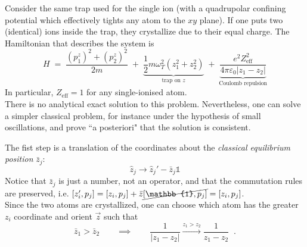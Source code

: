 Consider the same trap used for the single ion (with a quadrupolar confining potential which effectively tights any atom to the $xy$ plane). If one puts two (identical) ions inside the trap, they crystallize due to their equal charge.
The Hamiltonian that describes the system is 
\begin{equation}
\label{eq:atomsharmonic}
H \;=\;
\frac{(p_1^z)^2+(p_2^z)^2}{2m}
\;+\;
\underbrace{\frac{1}{2}m\omega_T^2(z_1^2+z_2^2)}
_{\text{trap on }{z}}
\;+\;
\underbrace{\frac{e^2 Z_{\text{eff}}^2
}{4\pi \varepsilon_0|z_1-z_2|}}
_{\text{Coulomb repulsion}}
\end{equation}
In particular, $Z_{\text{eff}}=1$ for any single-ionised atom. \\ 
There is no analytical exact solution to this problem. Nevertheless, one can solve a simpler classical problem, for instance under the hypothesis of small oscillations, and prove ``a posteriori" that the solution is consistent.

The fist step is a translation of the coordinates about the \textit{classical equilibrium position}
$\bar{z}_j$:
\begin{equation*}
\hat{z}_j \rightarrow \hat{z}_j' - \bar{z}_j\mathds{1}
\end{equation*}
Notice that $\bar{z}_j$ is just a number, not an operator, and that the commutation rules are preserved, i.e. $[z_i',p_j]=[z_i,p_j]+\bar{z}\cancel{[\mathbb{1},p_j]} = [z_i,p_j]$. \\
Since the two atoms are crystallized, one can choose which atom has the greater $z_i$ coordinate and orient $\vec{z}$ such that 
$$\bar{z}_1 > \bar{z}_2 \qquad \implies \qquad \frac{1}{|z_1-z_2|} \xrightarrow[]{z_1>z_2} \frac{1}{z_1-z_2} \;\;.$$


